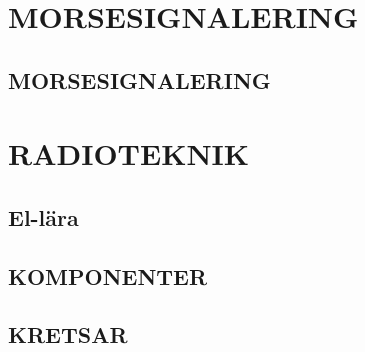 \documentclass[a4paper,twoside,twocolumn,openright]{book}
\begin{document}

\tableofcontents

\mainmatter






\part{MORSESIGNALERING}
\chapter*{MORSESIGNALERING}



\part{RADIOTEKNIK}
\chapter{El-lära}


\cleardoublepage

\cleardoublepage

\cleardoublepage

\cleardoublepage

\cleardoublepage

\cleardoublepage

\cleardoublepage

\cleardoublepage


\chapter{KOMPONENTER}

\cleardoublepage

\cleardoublepage

\cleardoublepage

\cleardoublepage

\cleardoublepage

\cleardoublepage

\cleardoublepage

\cleardoublepage


\chapter{KRETSAR}

\cleardoublepage

\cleardoublepage

\cleardoublepage

\cleardoublepage

\cleardoublepage

\cleardoublepage

\cleardoublepage

\cleardoublepage

\end{document}
